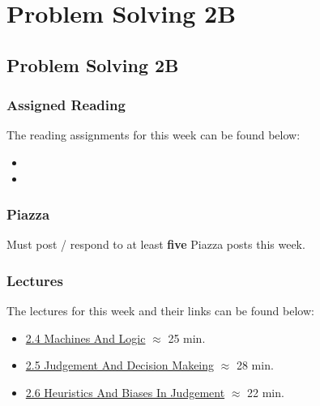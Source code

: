 \clearpage

\renewcommand{\ChapTitle}{Problem Solving 2B}
\renewcommand{\SectionTitle}{Problem Solving 2B}

\chapter{\ChapTitle}
\section{\SectionTitle}

\subsection{Assigned Reading}

The reading assignments for this week can be found below:

\begin{itemize}
    \item {}
    \item {}
\end{itemize}

\subsection{Piazza}

Must post / respond to at least \textbf{five} Piazza posts this week.

\subsection{Lectures}

The lectures for this week and their links can be found below:

\begin{itemize}
    \item \href{https://www.youtube.com/watch?v=8h0okzEM13M}{2.4 Machines And Logic} $\approx$ 25 min.
    \item \href{https://www.youtube.com/watch?v=IdZDwzxaCIY}{2.5 Judgement And Decision Makeing} $\approx$ 28 min.
    \item \href{https://www.youtube.com/watch?v=l6-UHqMy4Gg}{2.6 Heuristics And Biases In Judgement} $\approx$ 22 min.
\end{itemize}

